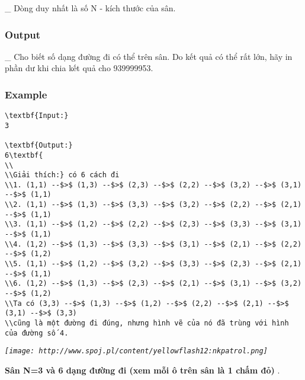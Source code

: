    \_ Dòng duy nhất là số N - kích thước của sân.  

\subsubsection{   Output  }

   \_ Cho biết số dạng đường đi có thể trên sân. Do kết quả có thể rất lớn, hãy in phần dư khi chia kết quả cho 939999953.  

\subsubsection{   Example  }
\begin{verbatim}
\textbf{Input:}
3

\textbf{Output:}
6\textbf{
\\
\\Giải thích:} có 6 cách đi
\\1. (1,1) --$>$ (1,3) --$>$ (2,3) --$>$ (2,2) --$>$ (3,2) --$>$ (3,1) --$>$ (1,1)
\\2. (1,1) --$>$ (1,3) --$>$ (3,3) --$>$ (3,2) --$>$ (2,2) --$>$ (2,1) --$>$ (1,1)
\\3. (1,1) --$>$ (1,2) --$>$ (2,2) --$>$ (2,3) --$>$ (3,3) --$>$ (3,1) --$>$ (1,1)
\\4. (1,2) --$>$ (1,3) --$>$ (3,3) --$>$ (3,1) --$>$ (2,1) --$>$ (2,2) --$>$ (1,2)
\\5. (1,1) --$>$ (1,2) --$>$ (3,2) --$>$ (3,3) --$>$ (2,3) --$>$ (2,1) --$>$ (1,1)
\\6. (1,2) --$>$ (1,3) --$>$ (2,3) --$>$ (2,1) --$>$ (3,1) --$>$ (3,2) --$>$ (1,2)
\\Ta có (3,3) --$>$ (1,3) --$>$ (1,2) --$>$ (2,2) --$>$ (2,1) --$>$ (3,1) --$>$ (3,3) 
\\cũng là một đường đi đúng, nhưng hình vẽ của nó đã trùng với hình của đường số 4.\end{verbatim}

\emph{
\texttt{[image: http://www.spoj.pl/content/yellowflash12:nkpatrol.png]}}

\textbf{    Sân N=3 và 6 dạng đường đi (xem mỗi ô trên sân là 1 chấm đỏ)   }   .  